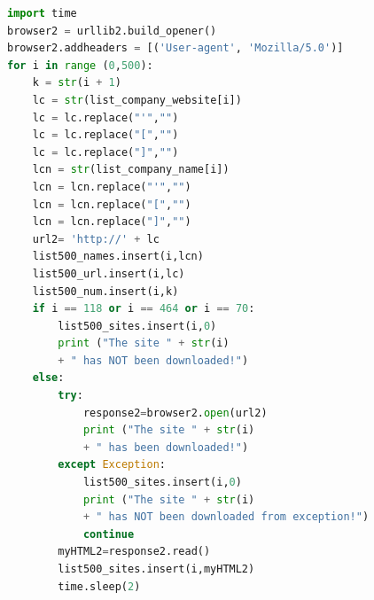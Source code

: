 \documentclass{article}
\begin{document}
\begin{lstlisting}[language=Python]
import time
browser2 = urllib2.build_opener()
browser2.addheaders = [('User-agent', 'Mozilla/5.0')]
for i in range (0,500):
    k = str(i + 1)
    lc = str(list_company_website[i])
    lc = lc.replace("'","")
    lc = lc.replace("[","")
    lc = lc.replace("]","")
    lcn = str(list_company_name[i])
    lcn = lcn.replace("'","")
    lcn = lcn.replace("[","")
    lcn = lcn.replace("]","")
    url2= 'http://' + lc
    list500_names.insert(i,lcn)
    list500_url.insert(i,lc)
    list500_num.insert(i,k)
    if i == 118 or i == 464 or i == 70:
        list500_sites.insert(i,0)  
        print ("The site " + str(i) 
        + " has NOT been downloaded!")
    else:
        try:
            response2=browser2.open(url2)
            print ("The site " + str(i) 
            + " has been downloaded!")
        except Exception:
            list500_sites.insert(i,0)
            print ("The site " + str(i) 
            + " has NOT been downloaded from exception!")           
            continue 
        myHTML2=response2.read()
        list500_sites.insert(i,myHTML2)        
        time.sleep(2)         
\end{lstlisting}
\end{document}
